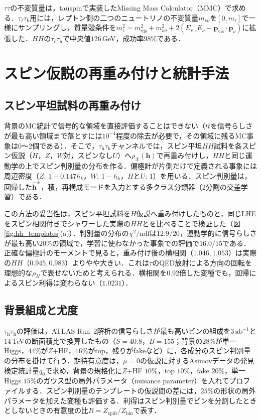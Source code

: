 \documentclass[paper=a4,fontsize=10pt,jafontsize=10pt,line_length=44zw,number_of_lines=46]{jlreq}
\newcommand{\tauh}{\tau_{\mathrm{h}}}
\newcommand{\taul}{\tau_{\ell}}
\newcommand{\abinv}{\,\mathrm{ab}^{-1}}
\newcommand{\hvec}{\boldsymbol{h}}
\begin{document}
$\tau\tau$の不変質量は，tauspinで実装したMissing Mass Calculator（MMC）\cite{Elagin:2010aw}で求める．$\taul\tauh$用には，レプトン側の二つのニュートリノの不変質量$m_{\nu\nu}$を$[0,m_\tau]$で一様にサンプリングし，質量殻条件を$m_\tau^2=m_{\mathrm{vis}}^2+m_{\nu\nu}^2+2(E_{\mathrm{vis}}E_\nu-\boldsymbol p_{\mathrm{vis}}\!\cdot\boldsymbol p_\nu)$に拡張した．$HH$の$\taul\tauh$で中央値$126$\,GeV，成功率$98\%$である．

\section{スピン仮説の再重み付けと統計手法}\label{sec:stat}

\subsection{スピン平坦試料の再重み付け}

背景のMC統計で信号的な領域を直接評価することはできない（$t\bar t$を信号らしさが最も高い領域まで落とすには$10^{-4}$程度の除去が必要で，その領域に残るMC事象は0〜2個である）．そこで，$\tauh\tauh$チャンネルでは，スピン平坦$HH$試料を各スピン仮説（$H$，$Z$，$W$対，スピンなし$U$）へ$\rho_X(\hvec)$で再重み付けし，$HH$と同じ運動学の上でスピン判別量の分布を作る．偏極計が片側だけで定義される事象には周辺密度（$Z$: $1-0.147h_k$，$W$: $1-h_k$，$H$と$U$: 1）を用いる．スピン判別量は，回帰した$\hat{\hvec}^\pm$，積，再構成モードを入力とする多クラス分類器（2分割の交差学習）である．

この方法の妥当性は，スピン平坦試料を$H$仮説へ重み付けしたものと，同じLHEをスピン相関付きでシャワーした実際の$HH$とを比べることで検証した（図\ref{fig:hh_templates}(a)）．判別量の分布の$\chi^2/\mathrm{ndf}$は$12.9/20$，運動学的に信号らしさが最も高い$20\%$の領域で，学習に使わなかった事象での評価で$16.0/15$である．正確な偏極計のモーメントで見ると，重み付け後の横相関（$1.046,1.053$）は実際の$HH$（$0.945,0.983$）よりやや大きい．これは$\tau$のQED放射による方向の回転を理想的な$\rho_H$で表せないためと考えられる．横相関を$0.92$倍した変種でも，回帰によるスピン利得は変わらない（$1.0231$）．

\subsection{背景組成と尤度}

$\tauh\tauh$の評価は，ATLAS Run~2解析の信号らしさが最も高いビン\cite{ATLAS:2022xzm}の組成を$3\abinv$と14\,TeVの断面積比で換算したもの（$S=40.8$，$B=155$；背景の$28\%$が単一Higgs，$44\%$が$Z$+HF，$16\%$がtop，残りがfakeなど）に，各成分のスピン判別量の分布を掛けて行う．期待有意度は，$\mu=0$の仮説に対するAsimovデータの発見検定統計量$q_0$\cite{Cowan:2010js}で求め，背景の規格化に$Z$+HF $10\%$，top $10\%$，fake $20\%$，単一Higgs $15\%$のガウス型の局外パラメータ（nuisance parameter）を入れてプロファイルする．スピン判別量のテンプレートの仮説間の差には，$25\%$の形状の局外パラメータを加えた変種も評価する．利得はスピン判別量でビンを分割したときとしないときの有意度の比$R=Z_{\mathrm{split}}/Z_{\mathrm{bin}}$で表す．
\end{document}
